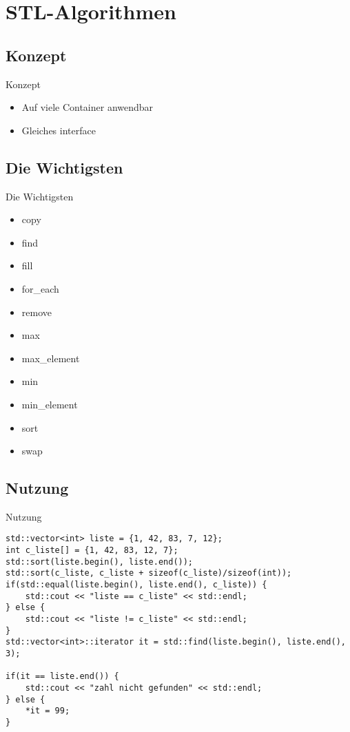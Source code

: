 \section{STL-Algorithmen}


\subsection{Konzept}

\begin{frame}{Konzept}
	\begin{itemize}
		\item Auf viele Container anwendbar
		\item Gleiches interface
	\end{itemize}
\end{frame}

\subsection{Die Wichtigsten}

\begin{frame}{Die Wichtigsten}
	\begin{itemize}
		\item copy
		\item find
		\item fill
		\item for\_each
		\item remove
		\item max
		\item max\_element
		\item min
		\item min\_element
		\item sort
		\item swap
	\end{itemize}
\end{frame}

\subsection{Nutzung}

\begin{frame}[fragile]{Nutzung}
	
	\begin{lstlisting}[escapechar=\$]
std::vector<int> liste = {1, 42, 83, 7, 12};
int c_liste[] = {1, 42, 83, 12, 7};
std::sort(liste.begin(), liste.end());
std::sort(c_liste, c_liste + sizeof(c_liste)/sizeof(int));
if(std::equal(liste.begin(), liste.end(), c_liste)) {
	std::cout << "liste == c_liste" << std::endl;
} else {
	std::cout << "liste != c_liste" << std::endl;
}
std::vector<int>::iterator it = std::find(liste.begin(), liste.end(), 3);

if(it == liste.end()) {
	std::cout << "zahl nicht gefunden" << std::endl;
} else {
	*it = 99;
}
	\end{lstlisting}
	
\end{frame}
